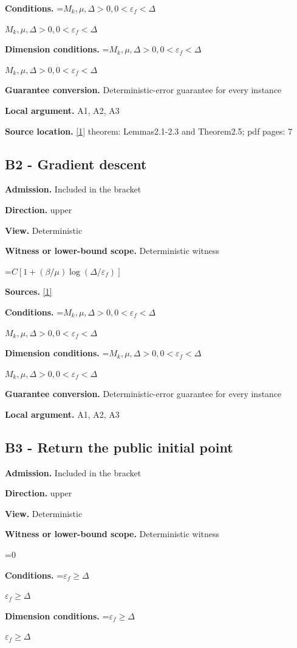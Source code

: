\documentclass[10pt,a4paper]{article}
\newcommand{\AtlasMath}[1]{\par\begingroup\centering\setbox0=\hbox{$\displaystyle #1$}\ifdim\wd0>1.4\linewidth\typeout{ATLAS WIDE FORMULA: \the\wd0}\fi\ifdim\wd0>\linewidth\resizebox{\linewidth}{!}{\box0}\else\box0\fi\par\endgroup}
\newcommand{\AtlasInlineMath}[1]{\begingroup\setbox0=\hbox{$#1$}\ifdim\wd0>.4\linewidth\endgroup\AtlasMath{#1}\else\endgroup$#1$\fi}
\begin{document}
\textbf{Conditions.} \AtlasInlineMath{M_k,\mu,\Delta>0,0<\varepsilon_f<\Delta}

\textbf{Dimension conditions.} \AtlasInlineMath{M_k,\mu,\Delta>0,0<\varepsilon_f<\Delta}

\textbf{Guarantee conversion.} Deterministic-error guarantee for every instance

\textbf{Local argument.} A1, A2, A3

\textbf{Source location.} \href{https://optimization-online.org/wp-content/uploads/2015/06/4970.pdf}{[1]} theorem: Lemmas2.1-2.3 and Theorem2.5; pdf pages: 7

\subsection{B2 - Gradient descent}
\textbf{Admission.} Included in the bracket

\textbf{Direction.} upper

\textbf{View.} Deterministic

\textbf{Witness or lower-bound scope.} Deterministic witness

\AtlasMath{C[1+(\beta/\mu)\log(\Delta/\varepsilon_f)]}
\textbf{Sources.} \href{https://optimization-online.org/wp-content/uploads/2015/06/4970.pdf}{[1]}

\textbf{Conditions.} \AtlasInlineMath{M_k,\mu,\Delta>0,0<\varepsilon_f<\Delta}

\textbf{Dimension conditions.} \AtlasInlineMath{M_k,\mu,\Delta>0,0<\varepsilon_f<\Delta}

\textbf{Guarantee conversion.} Deterministic-error guarantee for every instance

\textbf{Local argument.} A1, A2, A3

\subsection{B3 - Return the public initial point}
\textbf{Admission.} Included in the bracket

\textbf{Direction.} upper

\textbf{View.} Deterministic

\textbf{Witness or lower-bound scope.} Deterministic witness

\AtlasMath{0}
\textbf{Conditions.} \AtlasInlineMath{\varepsilon_f\ge \Delta}

\textbf{Dimension conditions.} \AtlasInlineMath{\varepsilon_f\ge \Delta}
\end{document}
